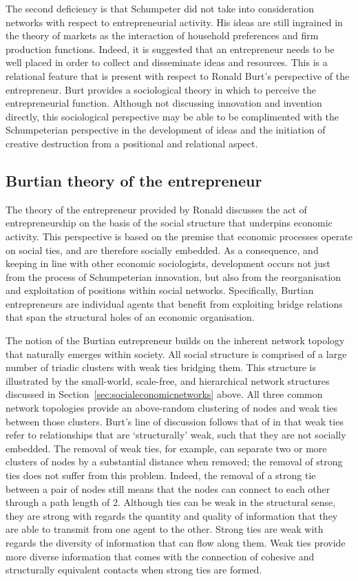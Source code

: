 The second deficiency is that Schumpeter did not take into consideration networks with respect to entrepreneurial activity. His ideas are still ingrained in the theory of markets as the interaction of household preferences and firm production functions. Indeed, it is suggested that an entrepreneur needs to be well placed in order to collect and disseminate ideas and resources. This is a relational feature that is present with respect to Ronald Burt's perspective of the entrepreneur. Burt provides a sociological theory in which to perceive the entrepreneurial function. Although not discussing innovation and invention directly, this sociological perspective may be able to be complimented with the Schumpeterian perspective in the development of ideas and the initiation of creative destruction from a positional and relational aspect.

\subsection{Burtian theory of the entrepreneur}

The theory of the entrepreneur provided by Ronald \citet{Burt1992, Burt2005, Burt2010} discusses the act of entrepreneurship on the basis of the social structure that underpins economic activity. This perspective is based on the premise that economic processes operate on social ties, and are therefore socially embedded. As a consequence, and keeping in line with other economic sociologists, development occurs not just from the process of Schumpeterian innovation, but also from the reorganisation and exploitation of positions within social networks. Specifically, Burtian entrepreneurs are individual agents that benefit from exploiting bridge relations that span the structural holes of an economic organisation.

The notion of the Burtian entrepreneur builds on the inherent network topology that naturally emerges within society. All social structure is comprised of a large number of triadic clusters with weak ties bridging them. This structure is illustrated by the small-world, scale-free, and hierarchical network structures discussed in Section~\ref{sec:socialeconomicnetworks} above. All three common network topologies provide an above-random clustering of nodes and weak ties between those clusters. Burt's line of discussion follows that of \citet{Granovetter1973} in that weak ties refer to relationships that are `structurally' weak, such that they are not socially embedded. The removal of weak ties, for example, can separate two or more clusters of nodes by a substantial distance when removed; the removal of strong ties does not suffer from this problem. Indeed, the removal of a strong tie between a pair of nodes still means that the nodes can connect to each other through a path length of 2. Although ties can be weak in the structural sense, they are strong with regards the quantity and quality of information that they are able to transmit from one agent to the other. Strong ties are weak with regards the diversity of information that can flow along them. Weak ties provide more diverse information that comes with the connection of cohesive and structurally equivalent contacts when strong ties are formed.

